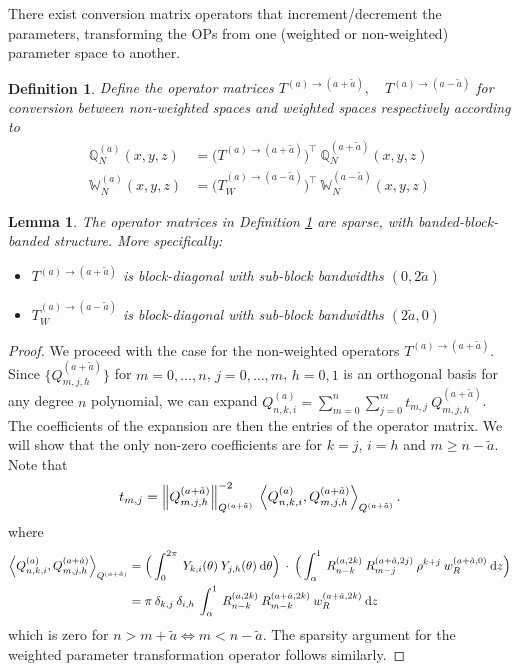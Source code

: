 \documentclass[11pt, oneside]{article}   	%
\newcommand{\genjac}{R}
\newcommand{\genjacnmk}{\genjac_{n-k}}
\newcommand{\genjacmmj}{\genjac_{m-j}}
\newcommand{\genjacw}{w_\genjac}
\newcommand{\bigW}{\mathbb{W}}
\newcommand{\scop}{Q}
\newcommand{\scopnki}{\scop_{n,k,i}}
\newcommand{\scopmjh}{\scop_{m,j,h}}
\newcommand{\scopnkia}{\scopnki^{(a)}}
\newcommand{\bigscop}{{\mathbb{Q}}}
\newcommand{\bigscopa}{\bigscop^{(a)}}
\newcommand{\bigscopN}{\bigscop_{N}}
\newcommand{\bigscopNa}{\bigscopa_{N}}
\newcommand{\ch}{Y}
\newcommand{\chki}{\ch_{k,i}}
\newcommand{\chjh}{\ch_{j,h}}
\newcommand{\bigWNa}{\mathbb{W}_N^{(a)}}
\newtheorem{lemma}{Lemma}
\newtheorem{definition}{Definition}
\begin{document}
There exist conversion matrix operators that increment/decrement the parameters, transforming the OPs from one (weighted or non-weighted) parameter space to another. 

\begin{definition}\label{def:parametertransformationoperators}
Define the operator matrices $T^{(a)\to(a+\tilde a)}, \quad T^{(a)\to(a-\tilde a)}$ for conversion between non-weighted spaces and weighted spaces respectively according to
\begin{align*}
	\bigscopNa(x,y,z) &= \Big(T^{(a)\to(a+\tilde a)} \Big)^\top \: \bigscopN^{(a+\tilde a)}(x,y,z) \\
	\bigWNa(x,y,z) &= \Big(T_W^{(a)\to(a-\tilde a)} \Big)^\top \: \bigW_N^{(a-\tilde a)}(x,y,z)
\end{align*}
\end{definition}

\begin{lemma}\label{lemma:sparsityofparametertransformationoperators}
The operator matrices in Definition \ref{def:parametertransformationoperators} are sparse, with banded-block-banded structure. More specifically:
\begin{itemize}
	\item $T^{(a)\to(a+\tilde a)}$ is block-diagonal with sub-block bandwidths $(0,2\tilde a)$
	\item $T_W^{(a)\to(a-\tilde a)}$ is block-diagonal with sub-block bandwidths $(2\tilde a, 0)$
\end{itemize}
\end{lemma}

\begin{proof}
We proceed with the case for the non-weighted operators $T^{(a)\to(a+\tilde a)}$. Since $\{\scopmjh^{(a+\tilde{a})}\}$ for $m = 0,\dots,n$, $j = 0,\dots,m$, $h = 0,1$ is an orthogonal basis for any degree $n$ polynomial, we can expand $\scopnkia = \sum_{m=0}^{n} \sum_{j=0}^m t_{m,j} \: \scopmjh^{(a+\tilde{a})}$. The coefficients of the expansion are then the entries of the operator matrix. We will show that the only non-zero coefficients are for $k = j$, $i = h$ and $m \ge  n - \tilde a$. Note that
\begin{align*}
	t_{m,j} = \norm{\scopmjh^{(a+\tilde{a})}}^{-2}_{\scop^{(a+\tilde a)}} \: \ip< \scopnkia, \scopmjh^{(a+\tilde{a})}>_{\scop^{(a+\tilde a)}}.
\end{align*}
where
\begin{align*}
	\ip< \scopnkia, \scopmjh^{(a+\tilde{a})}>_{\scop^{(a+\tilde a)}} &= \Big( \int_0^{2\pi} \: \chki(\theta) \: \chjh(\theta) \: \D \theta \Big) \: \cdot \: \Big( \int_\alpha^1 \: \genjacnmk^{(a, 2k)} \: \genjacmmj^{(a+\tilde a,2j)} \: \rho^{k+j} \: \genjacw^{(a + \tilde a, 0)} \: \D z \Big) \\
	&= \pi \: \delta_{k,j} \: \delta_{i,h} \: \int_\alpha^1 \: \genjacnmk^{(a, 2k)} \: \genjac_{m-k}^{(a+\tilde a,2k)} \: \genjacw^{(a + \tilde a, 2k)} \: \D z
\end{align*}
which is zero for $n > m + \tilde a \iff m < n - \tilde a$. The sparsity argument for the weighted parameter transformation operator follows similarly.
\end{proof}
\end{document}
